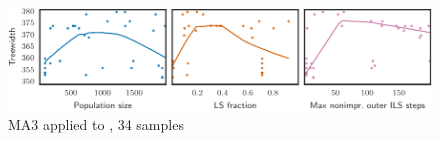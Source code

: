 \begin{figure}[h]\strictpagecheck\centering

\includegraphics[scale=0.85]{plots/MA3-correlation-regplots-le450-15c-0-crop.pdf}


\caption[Parameter influence for MA3 when applied to ]{\gls{MA3} applied to , 34 samples}

\label{MA3-correlation-regplots-le450-15c}

\end{figure}